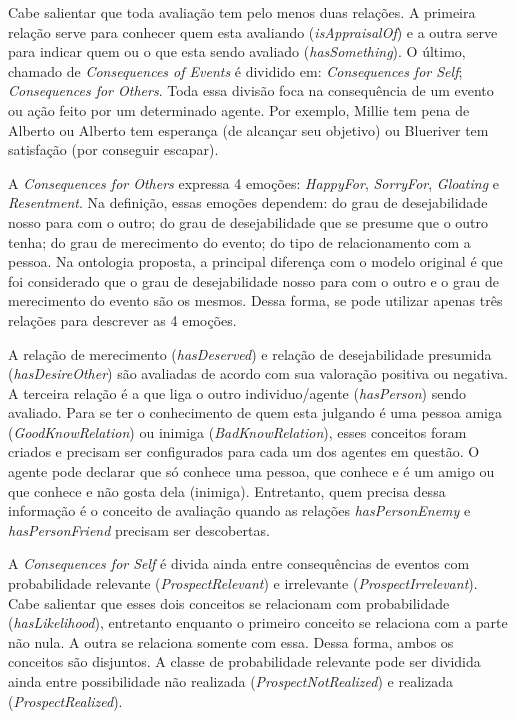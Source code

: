 Cabe salientar que toda avaliação tem pelo menos duas relações. A primeira
relação serve para conhecer quem esta avaliando (\emph{isAppraisalOf}) e a
outra serve para indicar quem ou o que esta sendo avaliado
(\emph{hasSomething}). O último, chamado de \emph{Consequences of Events} é
dividido em: \emph{Consequences for Self}; \emph{Consequences for Others}.
Toda essa divisão foca na consequência de um evento ou ação feito por um
determinado agente. Por exemplo, Millie tem pena de Alberto ou
Alberto tem esperança (de alcançar seu objetivo) ou Blueriver tem satisfação
(por conseguir escapar).

A \emph{Consequences for Others} expressa 4 emoções: \emph{HappyFor},
\emph{SorryFor}, \emph{Gloating} e \emph{Resentment}. Na definição, essas
emoções dependem: do grau de desejabilidade nosso para com o outro; do grau de
desejabilidade que se presume que o outro tenha; do grau de merecimento do
evento; do tipo de relacionamento com a pessoa. Na ontologia proposta, a principal
diferença com o modelo original é que foi considerado que o grau de
desejabilidade nosso para com o outro e o grau de merecimento do evento são os
mesmos. Dessa forma, se pode utilizar apenas três relações para descrever as
4 emoções.

A relação de merecimento (\emph{hasDeserved}) e relação de desejabilidade
presumida (\emph{hasDesireOther}) são avaliadas de acordo com sua valoração
positiva ou negativa. A terceira relação é a que liga o outro individuo/agente
(\emph{hasPerson}) sendo avaliado. Para se ter o conhecimento de quem esta
julgando é uma pessoa amiga (\emph{GoodKnowRelation}) ou inimiga
(\emph{BadKnowRelation}), esses conceitos foram criados e precisam ser
configurados para cada um dos agentes em questão. O agente pode declarar que
só conhece uma pessoa, que conhece e é um amigo ou que conhece e não gosta
dela (inimiga). Entretanto, quem precisa dessa informação é o conceito de
avaliação quando as relações \emph{hasPersonEnemy} e \emph{hasPersonFriend}
precisam ser descobertas.

A \emph{Consequences for Self} é divida ainda entre consequências de eventos
com probabilidade relevante (\emph{ProspectRelevant}) e irrelevante
(\emph{ProspectIrrelevant}). Cabe salientar que esses dois conceitos se
relacionam com probabilidade (\emph{hasLikelihood}), entretanto enquanto o
primeiro conceito se relaciona com a parte não nula. A outra se relaciona
somente com essa. Dessa forma, ambos os conceitos são disjuntos. A classe de
probabilidade relevante pode ser dividida ainda entre possibilidade não
realizada (\emph{ProspectNotRealized}) e realizada (\emph{ProspectRealized}).

